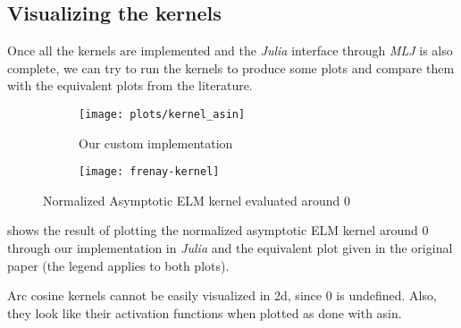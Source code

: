 
\subsection{Visualizing the kernels}

Once all the kernels are implemented and the \emph{Julia} interface through
\emph{MLJ} is also complete, we can try to run the kernels to produce some
plots and compare them with the equivalent plots from the literature.

\begin{figure}[H]
    \begin{subfigure}{.59\textwidth}
        \texttt{[image: plots/kernel\_asin]}
        \caption{Our custom implementation}
    \end{subfigure} \begin{subfigure}{.40\textwidth}
        \texttt{[image: frenay-kernel]}
        \caption{\textcite{frenayParameterinsensitiveKernelExtreme2011}}
    \end{subfigure}
    \caption{Normalized Asymptotic ELM kernel evaluated around 0}
    \label{fig:kernel_asin_comparison}
\end{figure}

 shows the result of plotting the normalized
asymptotic ELM kernel around 0 through our implementation in \emph{Julia} and
the equivalent plot given in the original paper (the legend applies to both
plots).

\begin{cnote}
    Arc cosine kernels cannot be easily visualized in 2d, since 0 is undefined.
    Also, they look like their activation functions when plotted as done
    with asin.
\end{cnote}

%
%


